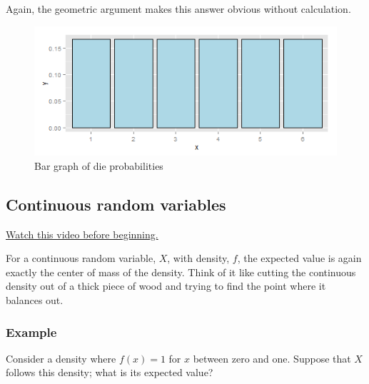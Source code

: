 \documentclass[]{article}
\begin{document}
Again, the geometric argument makes this answer obvious without
calculation.

\begin{figure}[htbp]
\centering
\includegraphics{LeanPub/images/die-1.png}
\caption{Bar graph of die probabilities}
\end{figure}

\subsection{Continuous random
variables}\label{continuous-random-variables}

\href{http://youtu.be/YS5EIKsamXI?list=PLpl-gQkQivXiBmGyzLrUjzsblmQsLtkzJ}{Watch
this video before beginning.}

For a continuous random variable, $X$, with density, $f$, the expected
value is again exactly the center of mass of the density. Think of it
like cutting the continuous density out of a thick piece of wood and
trying to find the point where it balances out.

\subsubsection{Example}\label{example-7}

Consider a density where $f(x) = 1$ for $x$ between zero and one.
Suppose that $X$ follows this density; what is its expected value?
\end{document}

